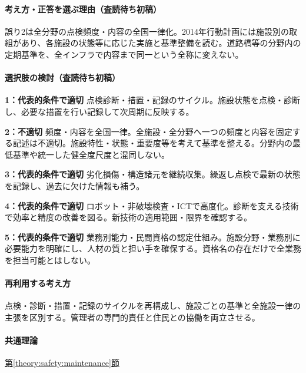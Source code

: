 \paragraph{考え方・正答を選ぶ理由（査読待ち初稿）} 誤り2は全分野の点検頻度・内容の全国一律化。2014年行動計画には施設別の取組があり、各施設の状態等に応じた実施と基準整備を読む。道路橋等の分野内の定期基準を、全インフラで内容まで同一という全称に変えない。

\paragraph{選択肢の検討（査読待ち初稿）}\mbox{}\par

\noindent\textbf{1：代表的条件で適切} 点検診断・措置・記録のサイクル。施設状態を点検・診断し、必要な措置を行い記録して次周期に反映する。\par

\noindent\textbf{2：不適切} 頻度・内容を全国一律。全施設・全分野へ一つの頻度と内容を固定する記述は不適切。施設特性・状態・重要度等を考えて基準を整える。分野内の最低基準や統一した健全度尺度と混同しない。\par

\noindent\textbf{3：代表的条件で適切} 劣化損傷・構造諸元を継続収集。繰返し点検で最新の状態を記録し、過去に欠けた情報も補う。\par

\noindent\textbf{4：代表的条件で適切} ロボット・非破壊検査・ICTで高度化。診断を支える技術で効率と精度の改善を図る。新技術の適用範囲・限界を確認する。\par

\noindent\textbf{5：代表的条件で適切} 業務別能力・民間資格の認定仕組み。施設分野・業務別に必要能力を明確にし、人材の質と担い手を確保する。資格名の存在だけで全業務を担当可能とはしない。\par

\paragraph{再利用する考え方} 点検・診断・措置・記録のサイクルを再構成し、施設ごとの基準と全施設一律の主張を区別する。管理者の専門的責任と住民との協働を両立させる。

\paragraph{共通理論} \hyperref[theory:safety:maintenance]{第\ref*{theory:safety:maintenance}節}

